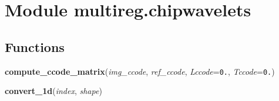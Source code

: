 %
%
%


\section{Module multireg.chipwavelets}

    \label{multireg:chipwavelets}


  \subsection{Functions}

    \label{multireg:chipwavelets:compute_ccode_matrix}
    \vspace{0.5ex}

    \begin{boxedminipage}{\textwidth}

    \raggedright \textbf{compute\_ccode\_matrix}(\textit{img\_ccode}, \textit{ref\_ccode}, \textit{Lccode}=\texttt{0\-.\-}, \textit{Tccode}=\texttt{0\-.\-})

    \end{boxedminipage}

    \label{multireg:chipwavelets:convert_1d}
    \vspace{0.5ex}

    \begin{boxedminipage}{\textwidth}

    \raggedright \textbf{convert\_1d}(\textit{index}, \textit{shape})

    \end{boxedminipage}

